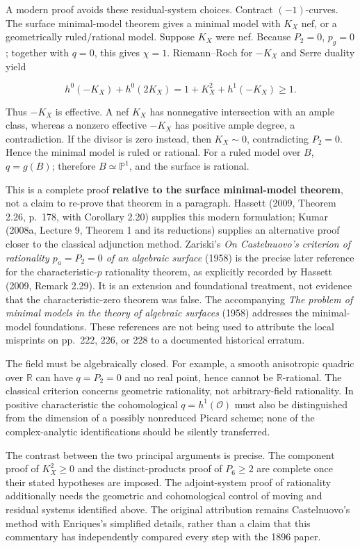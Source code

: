 A modern proof avoids these residual-system choices. Contract \((-1)\)-curves. The surface minimal-model theorem gives a minimal model with \(K_X\) nef, or a geometrically ruled/rational model. Suppose \(K_X\) were nef. Because \(P_2=0\), \(p_g=0\); together with \(q=0\), this gives \(\chi=1\). Riemann--Roch for \(-K_X\) and Serre duality yield

\[
h^0(-K_X)+h^0(2K_X)=1+K_X^2+h^1(-K_X)\geq1.
\]

Thus \(-K_X\) is effective. A nef \(K_X\) has nonnegative intersection with an ample class, whereas a nonzero effective \(-K_X\) has positive ample degree, a contradiction. If the divisor is zero instead, then \(K_X\sim0\), contradicting \(P_2=0\). Hence the minimal model is ruled or rational. For a ruled model over \(B\), \(q=g(B)\); therefore \(B\simeq\mathbb P^1\), and the surface is rational.

This is a complete proof \textbf{relative to the surface minimal-model theorem}, not a claim to re-prove that theorem in a paragraph. Hassett (2009, Theorem 2.26, p.~178, with Corollary 2.20) supplies this modern formulation; Kumar (2008a, Lecture 9, Theorem 1 and its reductions) supplies an alternative proof closer to the classical adjunction method. Zariski's \emph{On Castelnuovo's criterion of rationality \(p_a=P_2=0\) of an algebraic surface} (1958) is the precise later reference for the characteristic-\(p\) rationality theorem, as explicitly recorded by Hassett (2009, Remark 2.29). It is an extension and foundational treatment, not evidence that the characteristic-zero theorem was false. The accompanying \emph{The problem of minimal models in the theory of algebraic surfaces} (1958) addresses the minimal-model foundations. These references are not being used to attribute the local misprints on pp.~222, 226, or 228 to a documented historical erratum.

The field must be algebraically closed. For example, a smooth anisotropic quadric over \(\mathbb R\) can have \(q=P_2=0\) and no real point, hence cannot be \(\mathbb R\)-rational. The classical criterion concerns geometric rationality, not arbitrary-field rationality. In positive characteristic the cohomological \(q=h^1(\mathcal O)\) must also be distinguished from the dimension of a possibly nonreduced Picard scheme; none of the complex-analytic identifications should be silently transferred.

The contrast between the two principal arguments is precise. The component proof of \(K_X^2\ge0\) and the distinct-products proof of \(P_6\ge2\) are complete once their stated hypotheses are imposed. The adjoint-system proof of rationality additionally needs the geometric and cohomological control of moving and residual systems identified above. The original attribution remains Castelnuovo's method with Enriques's simplified details, rather than a claim that this commentary has independently compared every step with the 1896 paper.


